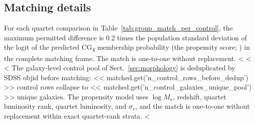 \documentclass{aa}
\newcommand{\CB}{Control\textsubscript{4B}}
\newcommand{\CC}{Control\textsubscript{4C}}
\newcommand{\CG}{CG\textsubscript{4}}
\newcommand{\RG}{RG\textsubscript{4}}
\begin{document}
\begin{appendix}
\subsection{Matching details}\label{app:matching_details}
For each quartet comparison in Table~\ref{tab:group_match_per_control}, the maximum permitted difference is 0.2 times the population standard deviation of the logit of the predicted \CG{} membership probability (the propensity score; \citealt{RosenbaumRubin1983,Austin2011}) in the complete matching frame. The match is one-to-one without replacement. <%
<%
<%
The galaxy-level control pool of Sect.~\ref{sec:morphology} is deduplicated by SDSS objid before matching: << matched.get('n_control_rows_before_dedup') >> control rows collapse to << matched.get('n_control_galaxies_unique_pool') >> unique galaxies. The propensity model uses \(\log M_\star\), redshift, quartet luminosity rank, quartet luminosity, and \(\sigma_v\), and the match is one-to-one without replacement within exact quartet-rank strata. <%


\end{appendix}
\end{document}
